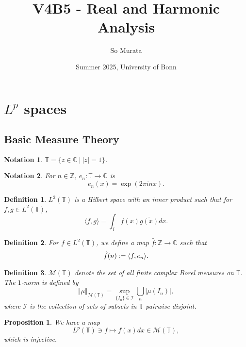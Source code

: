 \documentclass[8pt]{article}
\title{V4B5 - Real and Harmonic Analysis}
\author{So Murata}
\date{Summer 2025, University of Bonn}
\newtheorem{proposition}{Proposition}[section]
\newtheorem{definition}{Definition}[section]
\newtheorem{notation}{Notation}[section]
\newcommand{\norm}[1]{\Vert #1 \Vert}
\newcommand{\ab}[1]{\vert #1 \vert}
\newcommand{\sep}[0]{\:\vert\:}
\newcommand{\defeq}{\vcentcolon=}
\newcommand{\bZ}[0]{\mathbb{Z}}
\newcommand{\bC}[0]{\mathbb{C}}
\newcommand{\bT}[0]{\mathbb{T}}
\newcommand{\cM}[0]{\mathcal{M}}
\begin{document}
\maketitle

\section{$L^p$ spaces}
\subsection{Basic Measure Theory}
\begin{notation}
  $\bT = \{z\in\bC\sep \ab{z} = 1\}$.
\end{notation}

\begin{notation}
  For $n\in\bZ$, $e_n:\bT\to \bC$ is 
  \begin{equation*}
    e_n(x) = \exp(2\pi i nx).
  \end{equation*}
\end{notation}

\begin{definition}
  $L^2(\bT)$ is a Hilbert space with an inner product such that for $f,g\in L^2(\bT)$,
  \begin{equation*}
    \langle f,g\rangle = \int_{\bT}f(x)\overline{g(x)}dx.
  \end{equation*}
\end{definition}

\begin{definition}
  For $f\in L^2(\bT)$, we define a map $\hat{f}:\bZ\to \bC$ such that
  \begin{equation*}
    \hat{f}(n)\defeq \langle f,e_n\rangle.
  \end{equation*}
\end{definition}

\begin{definition}
  $\cM(\bT)$ denote the set of all finite complex Borel measures on $\bT$. The $1$-norm is defined by 
  \begin{equation*}
    \norm{\mu}_{\cM(\bT)} = \sup_{\{I_n\}\in\mathcal{I}}\bigcup_{n}\ab{\mu(I_n)},
  \end{equation*}
  where $\mathcal{I}$ is the collection of sets of subsets in $\bT$ pairwise disjoint.
\end{definition}

\begin{proposition}
  We have a map
  \begin{equation*}
    L^p(\bT)\ni f\mapsto f(x)dx\in\cM(\bT),
  \end{equation*}
  which is injective.
\end{proposition}
\end{document}
